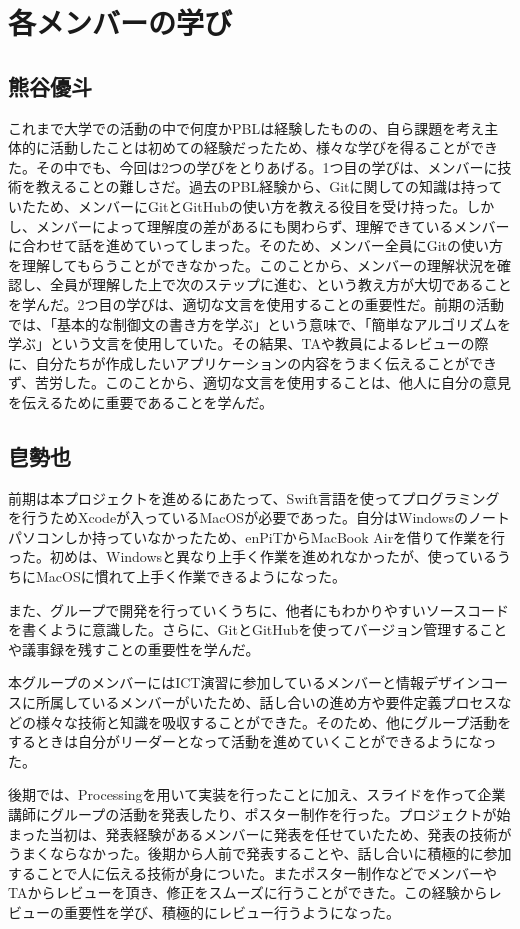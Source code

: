 \documentclass[openany,11pt,papersize]{jsbook}
\begin{document}
\section{各メンバーの学び}
\subsection{熊谷優斗}
\par これまで大学での活動の中で何度かPBLは経験したものの、自ら課題を考え主体的に活動したことは初めての経験だったため、様々な学びを得ることができた。その中でも、今回は2つの学びをとりあげる。1つ目の学びは、メンバーに技術を教えることの難しさだ。過去のPBL経験から、Gitに関しての知識は持っていたため、メンバーにGitとGitHubの使い方を教える役目を受け持った。しかし、メンバーによって理解度の差があるにも関わらず、理解できているメンバーに合わせて話を進めていってしまった。そのため、メンバー全員にGitの使い方を理解してもらうことができなかった。このことから、メンバーの理解状況を確認し、全員が理解した上で次のステップに進む、という教え方が大切であることを学んだ。2つ目の学びは、適切な文言を使用することの重要性だ。前期の活動では、「基本的な制御文の書き方を学ぶ」という意味で、「簡単なアルゴリズムを学ぶ」という文言を使用していた。その結果、TAや教員によるレビューの際に、自分たちが作成したいアプリケーションの内容をうまく伝えることができず、苦労した。このことから、適切な文言を使用することは、他人に自分の意見を伝えるために重要であることを学んだ。

\subsection{皀勢也}
前期は本プロジェクトを進めるにあたって、Swift言語を使ってプログラミングを行うためXcodeが入っているMacOSが必要であった。自分はWindowsのノートパソコンしか持っていなかったため、enPiTからMacBook Airを借りて作業を行った。初めは、Windowsと異なり上手く作業を進めれなかったが、使っているうちにMacOSに慣れて上手く作業できるようになった。
\par
また、グループで開発を行っていくうちに、他者にもわかりやすいソースコードを書くように意識した。さらに、GitとGitHubを使ってバージョン管理することや議事録を残すことの重要性を学んだ。
\par
本グループのメンバーにはICT演習に参加しているメンバーと情報デザインコースに所属しているメンバーがいたため、話し合いの進め方や要件定義プロセスなどの様々な技術と知識を吸収することができた。そのため、他にグループ活動をするときは自分がリーダーとなって活動を進めていくことができるようになった。
\par
後期では、Processingを用いて実装を行ったことに加え、スライドを作って企業講師にグループの活動を発表したり、ポスター制作を行った。プロジェクトが始まった当初は、発表経験があるメンバーに発表を任せていたため、発表の技術がうまくならなかった。後期から人前で発表することや、話し合いに積極的に参加することで人に伝える技術が身についた。またポスター制作などでメンバーやTAからレビューを頂き、修正をスムーズに行うことができた。この経験からレビューの重要性を学び、積極的にレビュー行うようになった。
\end{document}

